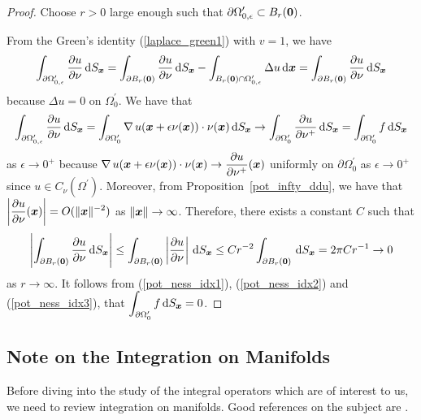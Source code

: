 \begin{proof}
Choose $r>0$ large enough such that
$\displaystyle \partial \Omega^{\prime}_{0,\epsilon} \subset B_r({\bm{0}})$.

From the Green's identity (\ref{laplace_green1}) with $v=1$, we have
\begin{equation} \label{pot_ness_idx1}
\int_{\partial \Omega^{\prime}_{0,\epsilon}} \frac{\partial{u}}{\partial \nu} \,\mathrm{d}{S}_{{\bm{x}}}
= \int_{\partial B_r({\bm{0}})} \frac{\partial{u}}{\partial \nu} \,\mathrm{d}{S}_{{\bm{x}}}
- \int_{B_r({\bm{0}}) \cap \Omega^{\prime}_{0,\epsilon}} \Delta u \,\mathrm{d}{{\bm{x}}} =
\int_{\partial B_r({\bm{0}})} \frac{\partial{u}}{\partial \nu} \,\mathrm{d}{S}_{{\bm{x}}}
\end{equation}
because $\displaystyle \Delta u = 0$ on $\Omega_0^{\prime}$.  We have that
\begin{equation} \label{pot_ness_idx2}
\int_{\partial \Omega^{\prime}_{0,\epsilon}} \frac{\partial{u}}{\partial \nu} \,\mathrm{d}{S}_{{\bm{x}}}
= \int_{\partial \Omega^{\prime}_0} \operatorname{\nabla} u({\bm{x}}
+ \epsilon \nu({\bm{x}}))
\cdot \nu({\bm{x}}) \,\mathrm{d}{S}_{{\bm{x}}}
\rightarrow \int_{\partial \Omega^{\prime}_0}
\frac{\partial{u}}{\partial \nu^+} \,\mathrm{d}{S}_{{\bm{x}}}
= \int_{\partial \Omega^{\prime}_0} f \,\mathrm{d}{S}_{{\bm{x}}}
\end{equation}
as $\epsilon \rightarrow 0^+$ because
$\displaystyle
\operatorname{\nabla} u({\bm{x}} + \epsilon \nu({\bm{x}})) \cdot \nu({\bm{x}})
\to \frac{\partial{u}}{\partial \nu^+}({\bm{x}})$ uniformly on
$\partial \Omega^{\prime}_0$ as
$\epsilon \to 0^+$ since $u \in C_{\nu}(\Omega^{\prime})$.
Moreover, from Proposition~\ref{pot_infty_ddu}, we have that 
$\displaystyle \left| \frac{\partial{u}}{\partial \nu}({\bm{x}})\right| =
O(\|{\bm{x}}\|^{-2})$ as $\|{\bm{x}}\|\rightarrow \infty$.  Therefore,
there exists a constant $C$ such that
\begin{equation} \label{pot_ness_idx3}
\left| \int_{\partial B_r({\bm{0}})} \frac{\partial{u}}{\partial \nu} 
\,\mathrm{d}{S}_{{\bm{x}}} \right| \leq
\int_{\partial B_r({\bm{0}})} \left| \frac{\partial{u}}{\partial \nu} \right|
\,\mathrm{d}{S}_{{\bm{x}}} \leq C r^{-2} \int_{\partial B_r({\bm{0}})}
\,\mathrm{d}{S}_{{\bm{x}}}
= 2\pi C r^{-1} \rightarrow 0
\end{equation}
as $r \rightarrow \infty$.
It follows from (\ref{pot_ness_idx1}), (\ref{pot_ness_idx2}) and
(\ref{pot_ness_idx3}), that
$\displaystyle \int_{\partial \Omega^{\prime}_0} f \,\mathrm{d}{S}_{{\bm{x}}} = 0$.
\end{proof}

\subsection{Note on the Integration on Manifolds} \label{pot_int_man}

Before diving into the study of the integral operators which are of
interest to us, we need to review integration on manifolds.  Good
references on the subject are \cite{Ab,Sp}.

